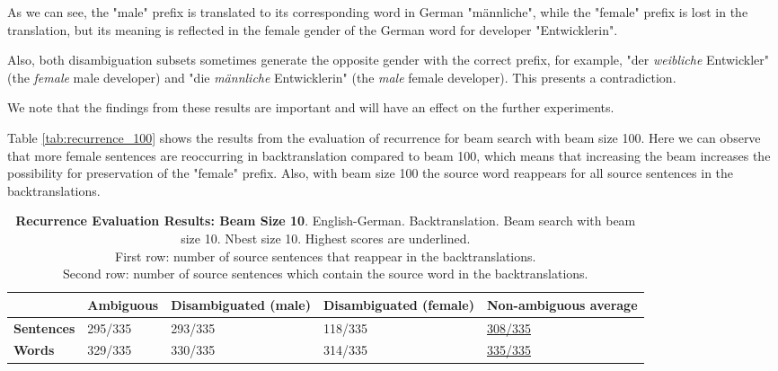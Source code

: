 As we can see, the "male" prefix is translated to its corresponding word in German "männliche", while the "female" prefix is lost in the translation, but its meaning is reflected in the female gender of the German word for developer "Entwicklerin".

Also, both disambiguation subsets sometimes generate the opposite gender with the correct prefix, for example, "der \textit{weibliche} Entwickler" (the \textit{female} male developer) and "die \textit{männliche} Entwicklerin" (the \textit{male} female developer). This presents a contradiction. 

We note that the findings from these results are important and will have an effect on the further experiments.

Table \ref{tab:recurrence_100} shows the results from the evaluation of recurrence for beam search with beam size 100. Here we can observe that more female sentences are reoccurring in backtranslation compared to beam 100, which means that increasing the beam increases the possibility for preservation of the "female" prefix.
Also, with beam size 100 the source word reappears for all source sentences in the backtranslations.

\begin{table} 
    \label{tab:recurrence_10}
    \begin{tabularx}{\linewidth}{|X|XXXX|}
        \hline
         & \textbf{Ambiguous} & \textbf{Disambiguated (male)} & \textbf{Disambiguated (female)} & \textbf{Non-ambiguous average} \\ \hline
         \textbf{Sentences} & 295/335 & 293/335 & 118/335 & \underline{308/335} \\ 
         \textbf{Words} & 329/335 & 330/335 & 314/335 & \underline{335/335} \\ \hline
    \end{tabularx}
    \caption{\textbf{Recurrence Evaluation Results: Beam Size 10}. English-German. Backtranslation. Beam search with beam size 10. Nbest size 10. Highest scores are underlined. \\ First row: number of source sentences that reappear in the backtranslations. \\ Second row: number of source sentences which contain the source word in the backtranslations.}
\end{table}

